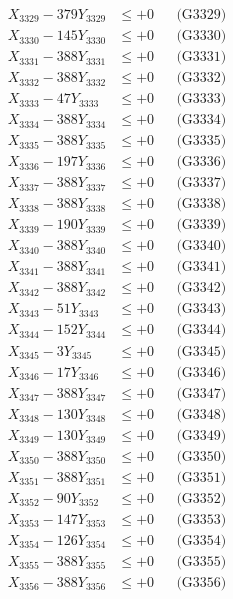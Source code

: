 \documentclass[a4paper,10pt]{article}
\begin{document}
{\begin{align}
X_{3329} - 379Y_{3329} &\leq +0 && \text{(G3329)} \\
X_{3330} - 145Y_{3330} &\leq +0 && \text{(G3330)} \\
\allowbreak
X_{3331} - 388Y_{3331} &\leq +0 && \text{(G3331)} \\
X_{3332} - 388Y_{3332} &\leq +0 && \text{(G3332)} \\
X_{3333} - 47Y_{3333} &\leq +0 && \text{(G3333)} \\
X_{3334} - 388Y_{3334} &\leq +0 && \text{(G3334)} \\
X_{3335} - 388Y_{3335} &\leq +0 && \text{(G3335)} \\
X_{3336} - 197Y_{3336} &\leq +0 && \text{(G3336)} \\
X_{3337} - 388Y_{3337} &\leq +0 && \text{(G3337)} \\
X_{3338} - 388Y_{3338} &\leq +0 && \text{(G3338)} \\
X_{3339} - 190Y_{3339} &\leq +0 && \text{(G3339)} \\
X_{3340} - 388Y_{3340} &\leq +0 && \text{(G3340)} \\
\allowbreak
X_{3341} - 388Y_{3341} &\leq +0 && \text{(G3341)} \\
X_{3342} - 388Y_{3342} &\leq +0 && \text{(G3342)} \\
X_{3343} - 51Y_{3343} &\leq +0 && \text{(G3343)} \\
X_{3344} - 152Y_{3344} &\leq +0 && \text{(G3344)} \\
X_{3345} - 3Y_{3345} &\leq +0 && \text{(G3345)} \\
X_{3346} - 17Y_{3346} &\leq +0 && \text{(G3346)} \\
X_{3347} - 388Y_{3347} &\leq +0 && \text{(G3347)} \\
X_{3348} - 130Y_{3348} &\leq +0 && \text{(G3348)} \\
X_{3349} - 130Y_{3349} &\leq +0 && \text{(G3349)} \\
X_{3350} - 388Y_{3350} &\leq +0 && \text{(G3350)} \\
\allowbreak
X_{3351} - 388Y_{3351} &\leq +0 && \text{(G3351)} \\
X_{3352} - 90Y_{3352} &\leq +0 && \text{(G3352)} \\
X_{3353} - 147Y_{3353} &\leq +0 && \text{(G3353)} \\
X_{3354} - 126Y_{3354} &\leq +0 && \text{(G3354)} \\
X_{3355} - 388Y_{3355} &\leq +0 && \text{(G3355)} \\
X_{3356} - 388Y_{3356} &\leq +0 && \text{(G3356)} \\

\end{align}}
\end{document}
